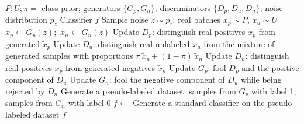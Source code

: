 \documentclass{article}
\begin{document}
\begin{algorithm}[!h]
\renewcommand{\algorithmicrequire}{\textbf{Input:}} %
\renewcommand{\algorithmicensure}{\textbf{Output:}} %
	\caption{GenPU} %
	\begin{algorithmic}[1] %
	    \REQUIRE
	    $P;U;\pi=$ class prior; generators $\{G_p,G_n\}$; discriminators $\{D_p,D_u,D_n\}$; noise distribution $p_z$
	    \ENSURE
	    Classifier $f$
	    \STATE Sample noise $z\sim p_z$; real batches $x_p\sim P$, $x_u\sim U$
	    \STATE $\tilde{x}_p\leftarrow G_p(z)$;\ $\tilde{x}_n\leftarrow G_n(z)$
	    \STATE Update $D_p$: distinguish real positives $x_p$ from generated $\tilde{x}_p$
	    \STATE Update $D_u$: distinguish real unlabeled $x_u$ from the mixture of generated samples with proportions $\pi\,\tilde{x}_p+(1-\pi)\,\tilde{x}_n$ %
	    \STATE Update $D_n$: distinguish real positives $x_p$ from generated negatives $\tilde{x}_n$ %
	    \STATE Update $G_p$: fool $D_p$ and the positive component of $D_u$
	    \STATE Update $G_n$: fool the negative component of $D_u$ while being rejected by $D_n$
	    \ENDWHILE
	    \STATE Generate a pseudo-labeled dataset: samples from $G_p$ with label 1, samples from $G_n$ with label 0 %
	    \STATE $f\leftarrow$ Generate a standard classifier on the pseudo-labeled dataset
		\RETURN $f$
	\end{algorithmic}
\end{algorithm}
\end{document}
